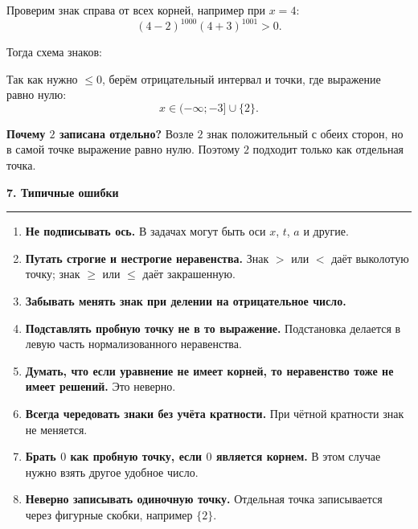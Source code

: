 \documentclass[a4paper,12pt]{article}
\newcommand{\sectiontitle}[1]{%
  \vspace{0.6em}
  {\Large\bfseries\textcolor{darkaccent}{#1}}\par
  \vspace{0.25em}
  {\color{accent}\rule{\linewidth}{0.5pt}}
  \vspace{0.4em}
}
\newcommand{\important}[1]{\textbf{\textcolor{darkaccent}{#1}}}
\newcommand{\closedpoint}[2]{\filldraw[accent] (#1,0) circle (2.2pt) node[below=6pt, text=black] {$#2$};}
\begin{document}
Проверим знак справа от всех корней, например при $x=4$:
\[
(4-2)^{1000}(4+3)^{1001}>0.
\]

Тогда схема знаков:

\begin{center}
\end{center}

Так как нужно $\le 0$, берём отрицательный интервал и точки, где выражение равно нулю:
\[
x\in(-\infty;-3]\cup\{2\}.
\]

\important{Почему $2$ записана отдельно?}
Возле $2$ знак положительный с обеих сторон, но в самой точке выражение равно нулю. Поэтому $2$ подходит только как отдельная точка.

\sectiontitle{7. Типичные ошибки}

\begin{enumerate}
  \item \important{Не подписывать ось.} В задачах могут быть оси $x$, $t$, $a$ и другие.
  \item \important{Путать строгие и нестрогие неравенства.} Знак $>$ или $<$ даёт выколотую точку; знак $\ge$ или $\le$ даёт закрашенную.
  \item \important{Забывать менять знак при делении на отрицательное число.}
  \item \important{Подставлять пробную точку не в то выражение.} Подстановка делается в левую часть нормализованного неравенства.
  \item \important{Думать, что если уравнение не имеет корней, то неравенство тоже не имеет решений.} Это неверно.
  \item \important{Всегда чередовать знаки без учёта кратности.} При чётной кратности знак не меняется.
  \item \important{Брать $0$ как пробную точку, если $0$ является корнем.} В этом случае нужно взять другое удобное число.
  \item \important{Неверно записывать одиночную точку.} Отдельная точка записывается через фигурные скобки, например $\{2\}$.
\end{enumerate}
\end{document}
